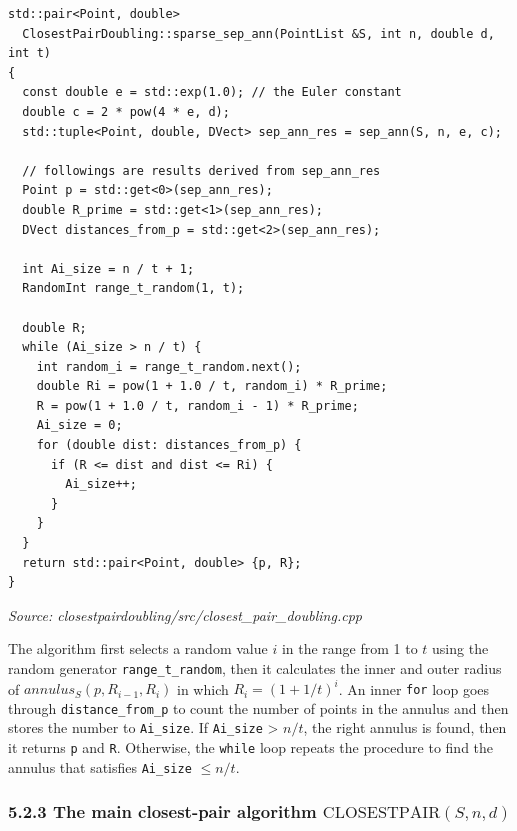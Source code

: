 \documentclass[12pt,english,]{article}
\newcommand{\code}[1]{\colorbox{light-gray}{\texttt{#1}}}
\newcommand{\pnt}[1]{{\scriptstyle#1}}
\begin{document}
\begin{lstlisting}
std::pair<Point, double>
  ClosestPairDoubling::sparse_sep_ann(PointList &S, int n, double d, int t)
{
  const double e = std::exp(1.0); // the Euler constant
  double c = 2 * pow(4 * e, d);
  std::tuple<Point, double, DVect> sep_ann_res = sep_ann(S, n, e, c);

  // followings are results derived from sep_ann_res
  Point p = std::get<0>(sep_ann_res);
  double R_prime = std::get<1>(sep_ann_res);
  DVect distances_from_p = std::get<2>(sep_ann_res);

  int Ai_size = n / t + 1;
  RandomInt range_t_random(1, t);

  double R;
  while (Ai_size > n / t) {
    int random_i = range_t_random.next();
    double Ri = pow(1 + 1.0 / t, random_i) * R_prime;
    R = pow(1 + 1.0 / t, random_i - 1) * R_prime;
    Ai_size = 0;
    for (double dist: distances_from_p) {
      if (R <= dist and dist <= Ri) {
        Ai_size++;
      }
    }
  }
  return std::pair<Point, double> {p, R};
}
\end{lstlisting}
\vspace{-9truemm}
\begin{minipage}{1\textwidth}
  \begin{flushright}
  {\footnotesize \emph{Source: closestpairdoubling/src/closest\_pair\_doubling.cpp}\par}
  \end{flushright}
\end{minipage}
\vspace{0.5truemm}

The algorithm first selects a random value \(i\) in the range from 1 to
\(t\) using the random generator \code{range\_t\_random}, then it
calculates the inner and outer radius of \(annulus_S(p, R_{i-1}, R_i)\)
in which \(R_i = (1+1/t)^i\). An inner \code{for} loop goes through
\code{distance\_from\_p} to count the number of points in the annulus
and then stores the number to \code{Ai\_size}. If \code{Ai\_size}
\textgreater{} \(n/t\), the right annulus is found, then it returns
\code{p} and \code{R}. Otherwise, the \code{while} loop repeats the
procedure to find the annulus that satisfies \code{Ai\_size}
\(\leq n/t\).

\hypertarget{section5.2.3}{%
\subsubsection{\texorpdfstring{5.2.3 The main closest-pair algorithm
\(\mathrm{C\pnt{LOSEST}P\pnt{AIR}}(S,n,d)\)}{5.2.3 The main closest-pair algorithm \textbackslash{}mathrm\{C\textbackslash{}pnt\{LOSEST\}P\textbackslash{}pnt\{AIR\}\}(S,n,d)}}\label{section5.2.3}}
\end{document}
